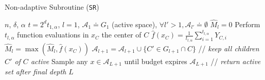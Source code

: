 \documentclass[final,12pt]{colt2018}
\begin{document}
\begin{algorithm}
\caption{Non-adaptive Subroutine (\texttt{SR})}
   \label{alg:warmup}
\begin{algorithmic}
    $n$, $\delta$, $\alpha$%
    $t=2^dt_{1,\alpha}$, $l=1$, $\mathcal{A}_1 \doteq G_1$ (active space), $\forall l'>1, \mathcal{A}_{l'} \doteq \emptyset$
   \STATE $\widehat{M}_l = 0$
   	\STATE Perform $t_{l,\alpha}$ function evaluations in $x_C$ the center of $C$
    \STATE $\widehat{f}(x_C) = \frac{1}{t_{l,\alpha}}\sum_{i=1}^{t_{l,\alpha}}Y_{C,i}$
    \STATE $\widehat{M}_l = \max(\widehat{M}_l, \widehat{f}(x_C))$
   \ENDFOR 
   \STATE $\mathcal{A}_{l+1} =\mathcal{A}_{l+1} \cup 
   \{C' \in G_{l+1} \cap C\}$ // \textit{keep all children $C'$ of $C$ active}
   \ENDIF
   \ENDFOR
   \ENDWHILE
   \STATE Sample any $x \in \mathcal{A}_{L+1}$ until budget expires
    $\mathcal{A}_{L+1}$ // \textit{return active set after final depth $L$}
\end{algorithmic}
\end{algorithm}
\end{document}
